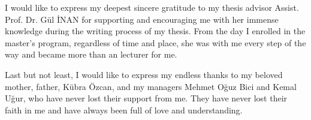 I would like to express my deepest sincere gratitude to my thesis advisor Assist. Prof. Dr. Gül İNAN for supporting and encouraging me with her immense knowledge during the writing process of my thesis. From the day I enrolled in the master's program, regardless of time and place, she was with me every step of the way and became more than an lecturer for me.

Last but not least, I would like to express my endless thanks to my beloved mother, father, Kübra Özcan, and my managers Mehmet Oğuz Bici and Kemal Uğur, who have never lost their support from me. They have never lost their faith in me and have always been full of love and understanding.